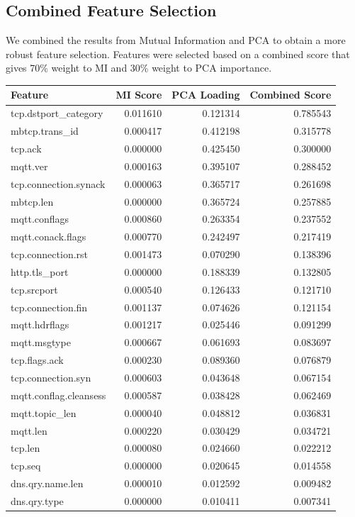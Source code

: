 \documentclass{article}
\begin{document}
\subsection{Combined Feature Selection}
We combined the results from Mutual Information and PCA to obtain a more robust feature selection. Features were selected based on a combined score that gives 70\% weight to MI and 30\% weight to PCA importance.
\begin{longtable}{lrrr}
\toprule
Feature & MI Score & PCA Loading & Combined Score \\
\midrule
tcp.dstport_category & 0.011610 & 0.121314 & 0.785543 \\
mbtcp.trans_id & 0.000417 & 0.412198 & 0.315778 \\
tcp.ack & 0.000000 & 0.425450 & 0.300000 \\
mqtt.ver & 0.000163 & 0.395107 & 0.288452 \\
tcp.connection.synack & 0.000063 & 0.365717 & 0.261698 \\
mbtcp.len & 0.000000 & 0.365724 & 0.257885 \\
mqtt.conflags & 0.000860 & 0.263354 & 0.237552 \\
mqtt.conack.flags & 0.000770 & 0.242497 & 0.217419 \\
tcp.connection.rst & 0.001473 & 0.070290 & 0.138396 \\
http.tls_port & 0.000000 & 0.188339 & 0.132805 \\
tcp.srcport & 0.000540 & 0.126433 & 0.121710 \\
tcp.connection.fin & 0.001137 & 0.074626 & 0.121154 \\
mqtt.hdrflags & 0.001217 & 0.025446 & 0.091299 \\
mqtt.msgtype & 0.000667 & 0.061693 & 0.083697 \\
tcp.flags.ack & 0.000230 & 0.089360 & 0.076879 \\
tcp.connection.syn & 0.000603 & 0.043648 & 0.067154 \\
mqtt.conflag.cleansess & 0.000587 & 0.038428 & 0.062469 \\
mqtt.topic_len & 0.000040 & 0.048812 & 0.036831 \\
mqtt.len & 0.000220 & 0.030429 & 0.034721 \\
tcp.len & 0.000080 & 0.024660 & 0.022212 \\
tcp.seq & 0.000000 & 0.020645 & 0.014558 \\
dns.qry.name.len & 0.000010 & 0.012592 & 0.009482 \\
dns.qry.type & 0.000000 & 0.010411 & 0.007341 \\

\end{longtable}
\end{document}
